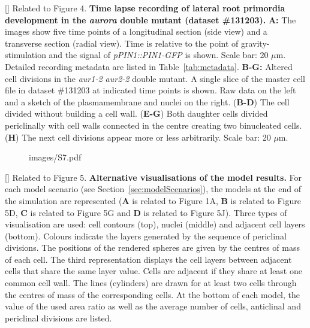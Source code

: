 \clearpage
{}[]{
Related to Figure 4.
{\bf Time lapse recording of lateral root primordia development in the \emph{aurora} double mutant (dataset \#131203).}
{\bf A:} The images show five time points of a longitudinal section (side view) and a transverse section (radial view). Time is relative to the point of gravity-stimulation and the signal of \emph{pPIN1::PIN1-GFP }is shown. Scale bar: 20 $\mu$m. Detailed recording metadata are listed in Table~\ref{tab:metadata}. {\bf B-G:} Altered cell divisions in the \emph{aur1-2 aur2-2} double mutant. A single slice of the master cell file in dataset \#131203 at indicated time points is shown. Raw data on the left and a sketch of the plasmamembrane and nuclei on the right. (\textbf{B-D}) The cell divided without building a cell wall. (\textbf{E-G}) Both daughter cells divided periclinally with cell walls connected in the centre creating two binucleated cells. (\textbf{H}) The next cell divisions appear more or less arbitrarily. Scale bar: 20 $\mu$m.
}
\label{fig:S6}
%
\clearpage
%
\begin{figure}[htbp]
\centering
	\begin{overpic}[width=1.\linewidth]{images/S7.pdf}
	\end{overpic}
\end{figure}
\clearpage
{}[]{
Related to Figure 5.
{\bf Alternative visualisations of the model results.} For each model scenario (see Section~\ref{sec:modelScenarios}), the models at the end of the simulation are represented (\textbf{A} is related to Figure 1A, \textbf{B} is related to Figure 5D, \textbf{C} is related to Figure 5G and \textbf{D} is related to Figure 5J). Three types of visualisation are used: cell contours (top), nuclei (middle) and adjacent cell layers (bottom). Colours indicate the layers generated by the sequence of periclinal divisions. The positions of the rendered spheres are given by the centres of mass of each cell. The third representation displays the cell layers between adjacent cells that share the same layer value. Cells are adjacent if they share at least one common cell wall. The lines (cylinders) are drawn for at least two cells through the centres of mass of the corresponding cells. At the bottom of each model, the value of the used area ratio as well as the average number of cells, anticlinal and periclinal divisions are listed.
}
\label{fig:S7}
%
\clearpage



